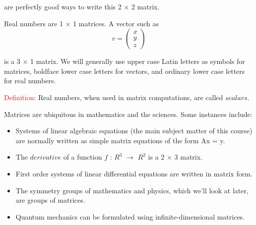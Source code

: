 \documentclass{book}
\begin{document}
are perfectly good ways to write this 2 × 2 matrix.

Real numbers are 1 × 1 matrices. A vector such as
$$ v = \begin{pmatrix} x \\ y \\ z \end{pmatrix} $$

is a 3 $\times$ 1 matrix. We will generally use upper case Latin letters as symbols for matrices, boldface lower case letters for vectors, and ordinary lower case letters for real numbers.

\textcolor{red}{Definition:} Real numbers, when used in matrix computations, are called $scalars$.

Matrices are ubiquitous in mathematics and the sciences. Some instances include:

\begin{itemize}
	\item Systems of linear algebraic equations (the main subject matter of this course) are normally written as simple matrix equations of the form Ax = y.
	\item The $derivative$ of a function $f$ : $R^3$ $\rightarrow$ $R^2$ is a 2 $\times$ 3 matrix.
	\item First order systems of linear differential equations are written in matrix form.
	\item The symmetry groups of mathematics and physics, which we’ll look at later, are groups of matrices.
	\item Quantum mechanics can be formulated using infinite-dimensional matrices.
\end{itemize}
\end{document}
